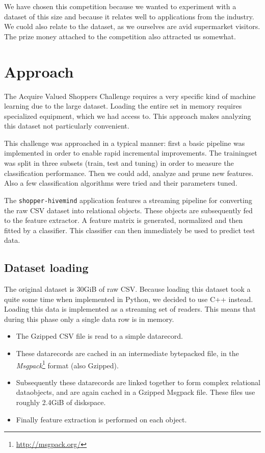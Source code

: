 \documentclass[a4paper]{jmlr}
\begin{document}
We have chosen this competition because we wanted to experiment with a dataset of this size and because it relates well to applications from the industry. We cuold also relate to the dataset, as we ourselves are avid supermarket visitors. The prize money attached to the competition also attracted us somewhat.

\section{Approach}

The Acquire Valued Shoppers Challenge requires a very specific kind of machine
learning due to the large dataset. Loading the entire set in memory requires
specialized equipment, which we had access to. This approach makes analyzing 
this dataset not particularly convenient.

This challenge was approached in a typical manner: first a basic pipeline was
implemented in order to enable rapid incremental improvements. The trainingset
was split in three subsets (train, test and tuning) in order to measure the
classification performance. Then we could add, analyze and prune new features.
Also a few classification algorithms were tried and their parameters tuned.

The \texttt{shopper-hivemind} application features a streaming pipeline for
converting the raw CSV dataset into relational objects. These objects are
subsequently fed to the feature extractor. A feature matrix is generated,
normalized and then fitted by a classifier. This classifier can then immediately
be used to predict test data.

\subsection{Dataset loading}

The original dataset is 30GiB of raw CSV. Because loading this dataset took a
quite some time when implemented in Python, we decided to use C++ instead.
Loading this data is implemented as a streaming set of readers. This means that
during this phase only a single data row is in memory.

\begin{itemize}
    \item The Gzipped CSV file is read to a simple datarecord.
    \item These datarecords are cached in an intermediate bytepacked file, in the
        \emph{Msgpack}\footnote{\url{http://msgpack.org/}} format (also Gzipped).
    \item Subsequently these datarecords are linked together to form complex
        relational dataobjects, and are again cached in a Gzipped Msgpack file.
        These files use roughly 2.4GiB of diskspace.
    \item Finally feature extraction is performed on each object.
\end{itemize}
\end{document}

